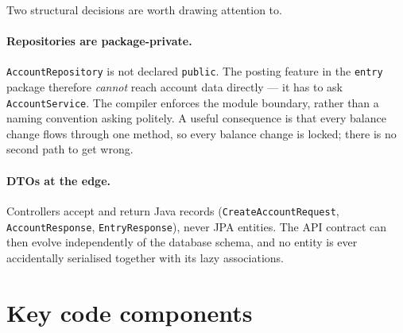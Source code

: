 \documentclass[11pt,a4paper]{article}
\begin{document}
Two structural decisions are worth drawing attention to.

\paragraph{Repositories are package-private.} \texttt{AccountRepository} is not declared
\texttt{public}. The posting feature in the \texttt{entry} package therefore \emph{cannot} reach
account data directly --- it has to ask \texttt{AccountService}. The compiler enforces the module
boundary, rather than a naming convention asking politely. A useful consequence is that every
balance change flows through one method, so every balance change is locked; there is no second
path to get wrong.

\paragraph{DTOs at the edge.} Controllers accept and return Java records
(\texttt{CreateAccountRequest}, \texttt{AccountResponse}, \texttt{EntryResponse}), never JPA
entities. The API contract can then evolve independently of the database schema, and no entity is
ever accidentally serialised together with its lazy associations.

\section{Key code components}
\end{document}
